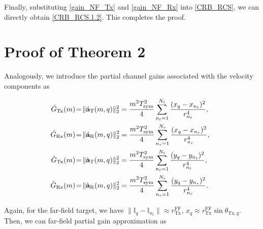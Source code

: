 \documentclass[9pt,final,journal,twocolumn]{IEEEtran}
\begin{document}
Finally, substituting \eqref{gain_NF_Tx} and \eqref{gain_NF_Rx} into 
\eqref{CRB_RCS}, we can directly obtain \eqref{CRB_RCS.1.2}. This completes the proof.


\section{Proof of Theorem 2}
Analogously, we introduce the partial channel gains associated with the velocity components as
\begin{small}
\begin{subequations} \label{gain_Tx_Rx_vx_vy}
 \begin{align} 
\hspace*{-0.5em}   \acute{G}_{\mathrm{Tx}}(m) &\!=\! \|\acute{\bf a}_{\mathrm{T}}(m,q)\|_2^2 = \frac{ m^2 T_{\mathrm{sym}}^2}
{4}\sum_{n_t=1}^{N_t}\frac{(x_q - x_{n_t})^2}{r_{n_t}^4}, \label{gain_Tx_vx}\\ 
\hspace*{-0.5em}   \acute{G}_{\mathrm{Rx}}(m) &\!=\! \|\acute{\bf a}_{\mathrm{R}}(m,q)\|_2^2 = \frac{ m^2 T_{\mathrm{sym}}^2}
{4}\sum_{n_r=1}^{N_r}\frac{(x_q - x_{n_r})^2}{r_{n_r}^4}, \label{gain_Rx_vx}\\
\hspace*{-0.5em}   \grave{G}_{\mathrm{Tx}}(m) &\!=\! \|\grave{\bf a}_{\mathrm{T}}(m,q)\|_2^2 = \frac{ m^2 T_{\mathrm{sym}}^2}
{4}\sum_{n_t=1}^{N_t}\frac{(y_q - y_{n_t})^2}{r_{n_t}^4}, \label{gain_Tx_vy}\\ 
\hspace*{-0.5em}   \grave{G}_{\mathrm{Rx}}(m) &\!=\! \|\grave{\bf a}_{\mathrm{R}}(m,q)\|_2^2 = \frac{ m^2 T_{\mathrm{sym}}^2}
{4}\sum_{n_r=1}^{N_r}\frac{(y_q - y_{n_r})^2}{r_{n_r}^4}. \label{gain_Rx_vy}
 \end{align}   
\end{subequations}
\end{small}
\noindent\hspace{-1em} Again, for the far-field target, we have $\|\mathbb I_q - \mathbb I_{n_t}\|\approx r_{\mathrm{Tx}}^{\mathrm{FF}}$, $x_q \approx r_{\mathrm{Tx}}^{\mathrm{FF}}\sin\theta_{\mathrm{Tx},q}$. Then, we can far-field partial gain approximation as
\end{document}
